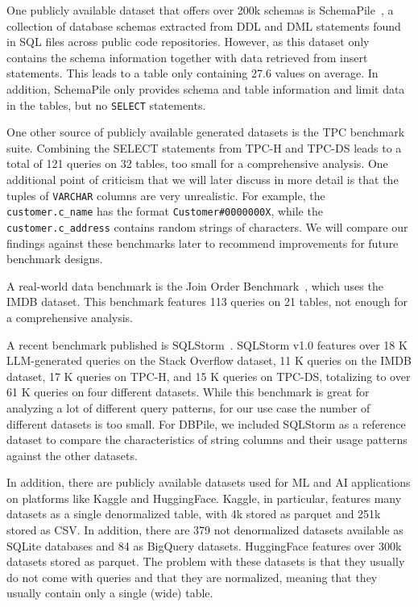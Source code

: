 One publicly available dataset that offers over 200k schemas is SchemaPile~\cite{dohmen_schemapile_2024}, a collection
of database schemas extracted from DDL and DML statements found in SQL files across public code repositories.
However, as this dataset only contains the schema information together with data retrieved from insert statements.
This leads to a table only containing 27.6 values on average.
In addition, SchemaPile only provides schema and table information and limit data in the tables, but no \texttt{SELECT} statements.

One other source of publicly available generated datasets is the TPC benchmark suite.
Combining the SELECT statements from TPC-H and TPC-DS leads to a total of 121 queries on 32 tables, too small for a comprehensive analysis.
One additional point of criticism that we will later discuss in more detail is that the tuples of \texttt{VARCHAR} columns are very unrealistic.
For example, the \texttt{customer.c\_name} has the format \texttt{Customer\#0000000X}, while the \texttt{customer.c\_address} contains random strings of characters.
We will compare our findings against these benchmarks later to recommend improvements for future benchmark designs.

A real-world data benchmark is the Join Order Benchmark~\cite{leis_how_2015}, which uses the IMDB dataset.
This benchmark features 113 queries on 21 tables, not enough for a comprehensive analysis.

A recent benchmark published is SQLStorm~\cite{schmidt_sqlstorm_2025}.
SQLStorm v1.0 features over 18 K \ac{LLM}-generated queries on the Stack Overflow dataset, 11 K queries on the IMDB dataset, 17 K queries on TPC-H, and 15 K queries on TPC-DS, totalizing to over 61 K queries on four different datasets.
While this benchmark is great for analyzing a lot of different query patterns, for our use case the number of different datasets is too small.
For DBPile, we included SQLStorm as a reference dataset to compare the characteristics of string columns and their usage patterns against the other datasets.

In addition, there are publicly available datasets used for ML and AI applications on platforms like Kaggle and HuggingFace.
Kaggle, in particular, features many datasets as a single denormalized table, with 4k stored as parquet and 251k stored as CSV. In addition,
there are 379 not denormalized datasets available as SQLite databases and 84 as BigQuery datasets.
HuggingFace features over 300k datasets stored as parquet.
The problem with these datasets is that they usually do not come with queries and that they are normalized, meaning that
they usually contain only a single (wide) table.

